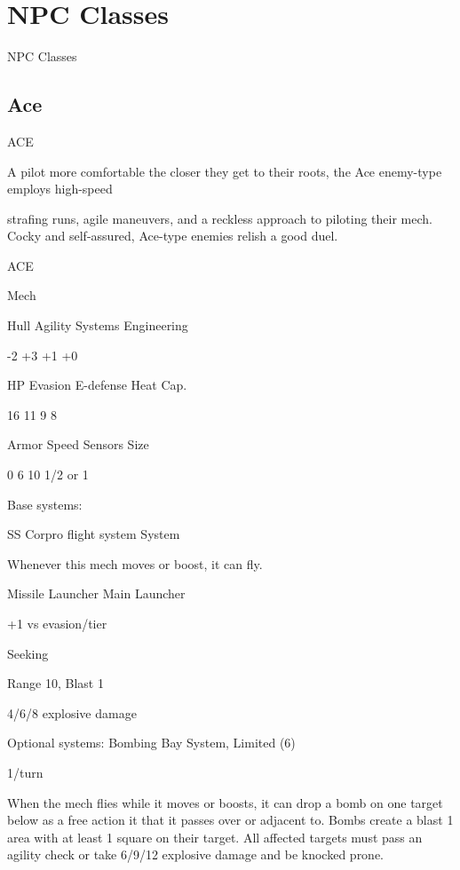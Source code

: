 \section{NPC Classes}

        NPC Classes  
\subsection{Ace}
                                                  ACE  

A pilot more comfortable the closer they get to their roots, the Ace enemy-type employs high-speed  

strafing runs, agile maneuvers, and a reckless approach to piloting their mech. Cocky and self-assured,  
Ace-type enemies relish a good duel.  
 

 ACE 

 Mech 

 Hull       Agility     Systems       Engineering 

 -2         +3          +1            +0 

 HP         Evasion     E-defense     Heat Cap. 

 16         11          9             8 

 Armor      Speed       Sensors       Size 

 0          6           10            1/2 or 1 

Base systems:
 
SS Corpro flight system  
System
 
Whenever this mech moves or boost, it can fly.
 

Missile Launcher  
Main Launcher
 
+1 vs evasion/tier
 
Seeking
 
Range 10, Blast 1
 
4/6/8 explosive damage
 

Optional systems:  
Bombing Bay  
System, Limited (6)
 
1/turn
 
When the mech flies while it moves or boosts, it can drop a bomb on one target below as a free  
action it that it passes over or adjacent to. Bombs create a blast 1 area with at least 1 square on  
their target. All affected targets must pass an agility check or take 6/9/12 explosive damage and  
be knocked prone.
 

                                                                                                       


